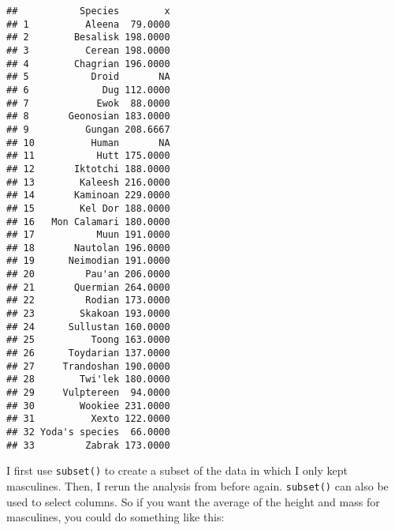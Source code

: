 \documentclass[
]{article}
\newenvironment{Shaded}{\begin{snugshade}}{\end{snugshade}}
\newcommand{\DataTypeTok}[1]{\textcolor[rgb]{0.13,0.29,0.53}{#1}}
\newcommand{\KeywordTok}[1]{\textcolor[rgb]{0.13,0.29,0.53}{\textbf{#1}}}
\newcommand{\NormalTok}[1]{#1}
\newcommand{\OperatorTok}[1]{\textcolor[rgb]{0.81,0.36,0.00}{\textbf{#1}}}
\newcommand{\StringTok}[1]{\textcolor[rgb]{0.31,0.60,0.02}{#1}}
\begin{document}
\begin{verbatim}
##           Species        x
## 1          Aleena  79.0000
## 2        Besalisk 198.0000
## 3          Cerean 198.0000
## 4        Chagrian 196.0000
## 5           Droid       NA
## 6             Dug 112.0000
## 7            Ewok  88.0000
## 8       Geonosian 183.0000
## 9          Gungan 208.6667
## 10          Human       NA
## 11           Hutt 175.0000
## 12       Iktotchi 188.0000
## 13        Kaleesh 216.0000
## 14       Kaminoan 229.0000
## 15        Kel Dor 188.0000
## 16   Mon Calamari 180.0000
## 17           Muun 191.0000
## 18       Nautolan 196.0000
## 19      Neimodian 191.0000
## 20         Pau'an 206.0000
## 21       Quermian 264.0000
## 22         Rodian 173.0000
## 23        Skakoan 193.0000
## 24      Sullustan 160.0000
## 25          Toong 163.0000
## 26      Toydarian 137.0000
## 27     Trandoshan 190.0000
## 28        Twi'lek 180.0000
## 29     Vulptereen  94.0000
## 30        Wookiee 231.0000
## 31          Xexto 122.0000
## 32 Yoda's species  66.0000
## 33         Zabrak 173.0000
\end{verbatim}

I first use \texttt{subset()} to create a subset of the data in which I only kept masculines. Then, I rerun
the analysis from before again. \texttt{subset()} can also be used to select columns. So if you want
the average of the height and mass for masculines, you could do something like this:

\begin{Shaded}
\end{Shaded}
\end{document}
